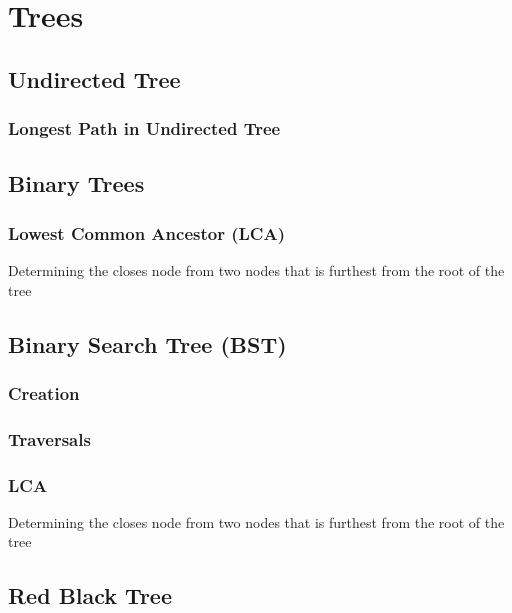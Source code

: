 \section{Trees} \label{trees}

\subsection{Undirected Tree}


\subsubsection{Longest Path in Undirected Tree}


\clearpage

\subsection{Binary Trees}



\subsubsection{Lowest Common Ancestor (LCA)}
Determining the closes node from two nodes that is furthest from the root of the tree


\clearpage

\subsection{Binary Search Tree (BST)}

\subsubsection{Creation}


\subsubsection{Traversals}


\clearpage

\subsubsection{LCA}
Determining the closes node from two nodes that is furthest from the root of the tree


\clearpage

\subsection{Red Black Tree}

\clearpage



